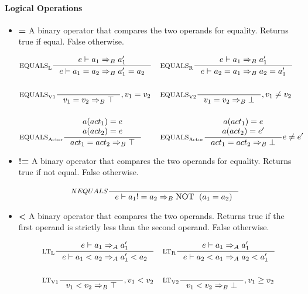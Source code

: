 
\paragraph{Logical Operations}
\label{sec:logicOps}

\begin{itemize}
\item \textbf{=} A binary operator that compares the two operands for equality. Returns true if equal. False otherwise.

\begin{align*}
&\inference[$\text{EQUALS}_\text{L}$]{e \vdash a_1 \Rightarrow_B a_1'}
                    {e \vdash a_1 = a_2 \Rightarrow_B a_1' = a_2}
&
&\inference[$\text{EQUALS}_\text{R}$]{e \vdash a_1 \Rightarrow_B a_1'}
                    {e \vdash a_2 = a_1 \Rightarrow_B a_2 = a_1'}
\\\\
&\inference[$\text{EQUALS}_\text{V1}$]{}
                    {v_1 = v_2 \Rightarrow_B \top}
                    {, v_1 = v_2}
&
&\inference[$\text{EQUALS}_\text{V2}$]{}
                    {v_1 = v_2 \Rightarrow_B \bot}
                    {, v_1 \neq v_2}
\\\\
&\inference[$\text{EQUALS}_\text{Actor}$]{a(act_1) = e\\ a(act_2) = e}
                    {act_1 = act_2 \Rightarrow_B \top}
&
&\inference[$\text{EQUALS}_\text{Actor}$]{a(act_1) = e\\ a(act_2) = e'}
                    {act_1 = act_2 \Rightarrow_B \bot}
                    {e \neq e'}
\end{align*}

\item \textbf{!=} A binary operator that compares the two operands for equality. Returns true if not equal. False otherwise.

\begin{align*}
&\inference[$NEQUALS$]{}
                    {e \vdash a_1 != a_2 \Rightarrow_B \Tnot (a_1 = a_2)}
\end{align*}

\item \textbf{<} A binary operator that compares the two operands. Returns true if the first operand is strictly less than the second operand. False otherwise.

\begin{align*}
&\inference[$\text{LT}_\text{L}$]{e \vdash a_1 \Rightarrow_A a_1'}
                    {e \vdash a_1 < a_2 \Rightarrow_A a_1' < a_2}
&
&\inference[$\text{LT}_\text{R}$]{e \vdash a_1 \Rightarrow_A a_1'}
                    {e \vdash a_2 < a_1 \Rightarrow_A a_2 < a_1'}
\\\\
&\inference[$\text{LT}_\text{V1}$]{}
                    {v_1 < v_2 \Rightarrow_B \top}
                    {, v_1 < v_2}
&
&\inference[$\text{LT}_\text{V2}$]{}
                    {v_1 < v_2 \Rightarrow_B \bot}
                    {, v_1 \geq v_2}
\end{align*}


\end{itemize}
